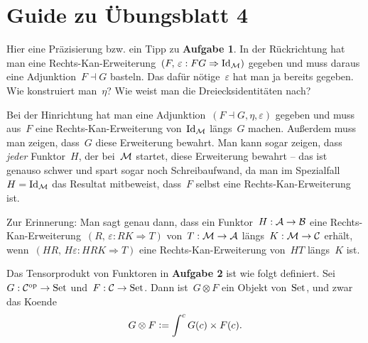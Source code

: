 \documentclass{uebblatt}
\begin{document}
\section*{Guide zu Übungsblatt 4}

Hier eine Präzisierung bzw. ein Tipp zu \textbf{Aufgabe 1}. In der Rückrichtung
hat man eine Rechts-Kan-Erweiterung~$(F,\,\varepsilon : F G \Rightarrow \mathrm{Id}_{\mathcal{M}})$
gegeben und muss daraus eine Adjunktion~$F \dashv G$ basteln. Das dafür
nötige~$\varepsilon$ hat man ja bereits gegeben. Wie konstruiert man~$\eta$?
Wie weist man die Dreiecksidentitäten nach?

Bei der Hinrichtung hat man eine Adjunktion~$(F \dashv G, \eta, \varepsilon)$
gegeben und muss aus~$F$ eine Rechts-Kan-Erweiterung von~$\mathrm{Id}_{\mathcal{M}}$ längs~$G$
machen. Außerdem muss man zeigen, dass~$G$ diese Erweiterung bewahrt. Man kann
sogar zeigen, dass \emph{jeder} Funktor~$H$, der bei~$\mathcal{M}$ startet, diese
Erweiterung bewahrt -- das ist genauso schwer und spart sogar noch
Schreibaufwand, da man im Spezialfall~$H = \mathrm{Id}_{\mathcal{M}}$ das Resultat mitbeweist,
dass~$F$ selbst eine Rechts-Kan-Erweiterung ist.

Zur Erinnerung: Man sagt genau dann, dass ein Funktor~$H : \mathcal{A} \to \mathcal{B}$ eine
Rechts-Kan-Erweiterung~$(R,\,\varepsilon : RK \Rightarrow T)$ von~$T : \mathcal{M} \to
\mathcal{A}$ längs~$K : \mathcal{M} \to \mathcal{C}$ erhält, wenn~$(HR,\,H\varepsilon : HRK \Rightarrow
T)$ eine Rechts-Kan-Erweiterung von~$HT$ längs~$K$ ist.

Das Tensorprodukt von Funktoren in \textbf{Aufgabe 2} ist wie folgt definiert.
Sei~$G : \mathcal{C}^{\mathrm{op}} \to \mathrm{Set}$ und~$F : \mathcal{C} \to \mathrm{Set}$. Dann ist~$G \otimes F$ ein
Objekt von~$\mathrm{Set}$, und zwar das Koende
\[ G \otimes F \vcentcolon= \int^c G(c) \times F(c). \]
\end{document}
